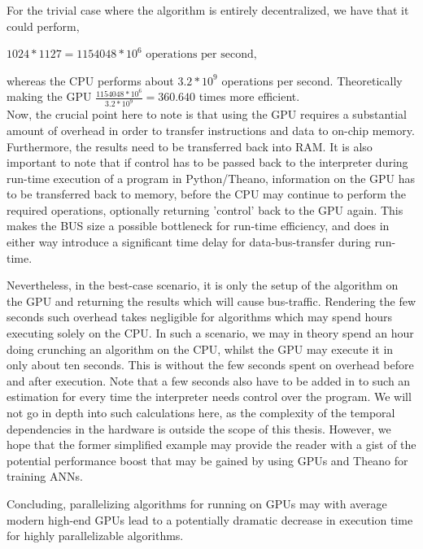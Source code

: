 For the trivial case where the algorithm is entirely decentralized, we have that it could perform,

\begin{center}
\begin{math}
    1024 * 1127 = 1 154 048 * 10^6 \text{ operations per second},
\end{math}
\end{center}
whereas the CPU performs about $3.2 * 10^9$ operations per second.
Theoretically making the GPU $\frac{1154048*10^6}{3.2*10^9} = 360.640$ times more efficient.
\\
Now, the crucial point here to note is that using the GPU requires a substantial amount of overhead in order to transfer instructions and data to on-chip memory. Furthermore, the results need to be transferred back into RAM. It is also important to note that if control has to be passed back to the interpreter during run-time execution of a program in Python/Theano, information on the GPU has to be transferred back to memory, before the CPU may continue to perform the required operations, optionally returning 'control' back to the GPU again. This makes the BUS size a possible bottleneck for run-time efficiency, and does in either way introduce a significant time delay for data-bus-transfer during run-time.

Nevertheless, in the best-case scenario, it is only the setup of the algorithm on the GPU and returning the results which will cause bus-traffic. Rendering the few seconds such overhead takes negligible for algorithms which may spend hours executing solely on the CPU. In such a scenario, we may in theory spend an hour doing crunching an algorithm on the CPU, whilst the GPU may execute it in only about ten seconds. This is without the few seconds spent on overhead before and after execution. Note that a few seconds also have to be added in to such an estimation for every time the interpreter needs control over the program. We will not go in depth into such calculations here, as the complexity of the temporal dependencies in the hardware is outside the scope of this thesis. However, we hope that the former simplified example may provide the reader with a gist of the potential performance boost that may be gained by using GPUs and Theano for training ANNs.

Concluding, parallelizing algorithms for running on GPUs may with average modern high-end GPUs lead to a potentially dramatic decrease in execution time for highly parallelizable algorithms.

